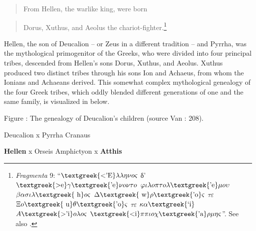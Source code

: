 \begin{quote}
From Hellen, the warlike king, were born
\end{quote}

\begin{quote}
Dorus, Xuthus, and Aeolus the chariot-fighter.\footnote{\textit{Fragmenta} 9: “$\text{\textgreek{<'E}}\lambda \lambda \eta \nu o\varsigma $ δ’ $\text{\textgreek{>e}}\gamma \text{\textgreek{'e}}\nu o\nu \tau o$ $\varphi \iota \lambda o\pi \tau o\lambda \text{\textgreek{'e}}\mu o\upsilon $ $\beta \alpha \sigma \iota \lambda \text{\textgreek{~h}}o\varsigma $ {\textbar} $\Delta \text{\textgreek{~w}}\rho \text{\textgreek{'o}}\varsigma $ $\tau \varepsilon $ $\Xi o\text{\textgreek{~u}}\theta \text{\textgreek{'o}}\varsigma $ $\tau \varepsilon $ $\kappa \alpha \text{\textgreek{`i}}$ $A\text{\textgreek{>'i}}o\lambda o\varsigma $ $\text{\textgreek{<i}}\pi \pi \iota o\chi \text{\textgreek{'a}}\rho \mu \eta \varsigma $”. See also \citet[64]{Hainsworth1967}.}
\end{quote}

Hellen, the son of Deucalion – or Zeus in a different tradition – and Pyrrha, was the mythological primogenitor of the Greeks, who were divided into four principal tribes, descended from Hellen’s sons Dorus, Xuthus, and Aeolus. Xuthus produced two distinct tribes through his sons Ion and Achaeus, from whom the Ionians and Achaeans derived. This somewhat complex mythological genealogy of the four Greek tribes, which oddly blended different generations of one and the same family, is visualized in  below.

\begin{stylecaption}
Figure : The genealogy of Deucalion’s children (source Van \citealt{Rooy2016b}: 208).
\end{stylecaption}

Deucalion x Pyrrha        Cranaus

\begin{styleListParagraph}
  \textbf{Hellen} x Orseis  Amphictyon  x  \textbf{Atthis}
\end{styleListParagraph}

\begin{styleListParagraph}

\end{styleListParagraph}

